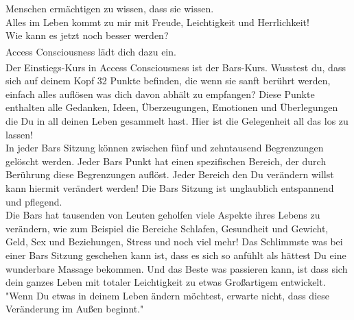 \documentclass[10pt,foldmark,notumble]{leaflet}
\begin{document}
\begin{flushleft}
Menschen ermächtigen zu wissen, dass sie wissen.\\
\vspace*{4mm}
Alles im Leben kommt zu mir mit Freude, Leichtigkeit und Herrlichkeit!\\
\vspace*{4mm}
Wie kann es jetzt noch besser werden? \\
\vspace*{4mm}
Access Consciousness\textsuperscript{\textregistered} lädt dich dazu ein. \\
\vspace*{4mm}
Der Einstiegs-Kurs in Access Consciousness\textsuperscript{\textregistered} ist der Bars-Kurs. Wusstest du, dass sich auf deinem Kopf 32 Punkte befinden, die wenn sie sanft berührt werden, einfach alles auflösen was dich davon abhält zu empfangen? Diese Punkte enthalten alle Gedanken, Ideen, Überzeugungen, Emotionen und Überlegungen die Du in all deinen Leben gesammelt hast. Hier ist die Gelegenheit all das los zu lassen!\\
\vspace*{4mm}
In jeder Bars Sitzung können zwischen fünf und zehntausend Begrenzungen gelöscht werden. Jeder Bars Punkt hat einen spezifischen Bereich, der durch Berührung diese Begrenzungen auflöst. Jeder Bereich den Du verändern willst kann hiermit verändert werden! Die Bars Sitzung ist unglaublich entspannend und pflegend.\\
\vspace*{4mm}
Die Bars hat tausenden von Leuten geholfen viele Aspekte ihres Lebens zu verändern, wie zum Beispiel die Bereiche Schlafen, Gesundheit und Gewicht, Geld, Sex und Beziehungen, Stress und noch viel mehr! Das Schlimmste was bei einer Bars Sitzung geschehen kann ist, dass es sich so anfühlt als hättest Du eine wunderbare Massage bekommen. Und das Beste was passieren kann, ist dass sich dein ganzes Leben mit totaler Leichtigkeit zu etwas Großartigem entwickelt.\\
\vspace*{4mm}
"Wenn Du etwas in deinem Leben ändern möchtest, erwarte nicht, dass diese Veränderung im Außen beginnt."\\
\end{flushleft}
\end{document}
